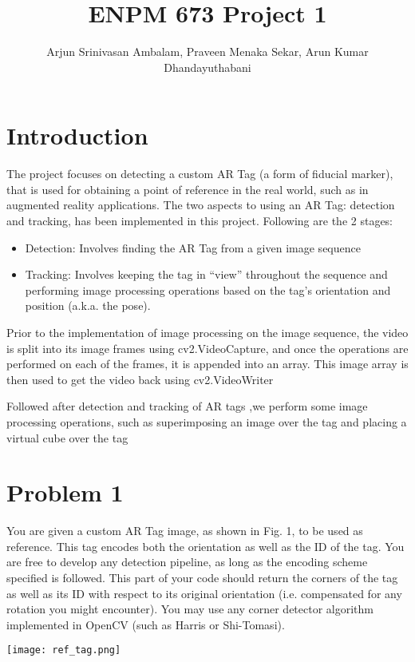 \documentclass{article}
\title{ENPM 673 Project 1}
\author{Arjun Srinivasan Ambalam, Praveen Menaka Sekar, Arun Kumar Dhandayuthabani}
\begin{document}
\maketitle

\section{Introduction}
The project focuses on detecting a custom AR Tag (a form of fiducial marker), that is used for obtaining a point of reference in the real world, such as in augmented reality applications. The two aspects to using an AR Tag: detection and tracking, has been implemented in this project. Following are the 2 stages:
\begin{itemize}
\item Detection: Involves finding the AR Tag from a given image sequence
\item Tracking: Involves keeping the tag in “view” throughout the sequence and performing image processing operations based on the tag’s orientation and position (a.k.a. the pose).
\end{itemize}

Prior to the implementation of image processing on the image sequence, the video is split into its image frames using cv2.VideoCapture, and once the operations are performed on each of the frames, it is appended into an array. This image array is then used to get the video back using cv2.VideoWriter

Followed after detection and tracking of AR tags ,we perform some image processing operations, such as superimposing an image over the tag and placing a virtual cube over the tag

\section{Problem 1}
You are given a custom AR Tag image, as shown in Fig. 1, to be used as reference. This tag encodes both the orientation as well as the ID of the tag.
You are free to develop any detection pipeline, as long as the encoding scheme specified is followed.
This part of your code should return the corners of the tag as well as its ID with respect to its original
orientation (i.e. compensated for any rotation you might encounter). You may use any corner detector
algorithm implemented in OpenCV (such as Harris or Shi-Tomasi).

\begin{center}
    \texttt{[image: ref\_tag.png]}
    
\end{center}
\end{document}
